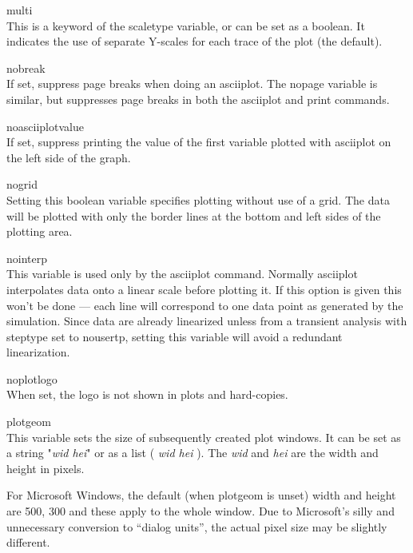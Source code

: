 \begin{description}
\item{\et multi}\\
This is a keyword of the {\et scaletype} variable, or can be set as a
boolean.  It indicates the use of separate Y-scales for each trace of
the plot (the default).

\item{\et nobreak}\\
If set, suppress page breaks when doing an {\cb asciiplot}.  The {\et
nopage} variable is similar, but suppresses page breaks in both the
{\cb asciiplot} and {\cb print} commands.

\item{\et noasciiplotvalue}\\
If set, suppress printing the value of the first variable plotted with
{\cb asciiplot} on the left side of the graph.

\item{\et nogrid}\\
Setting this boolean variable specifies plotting without use of a
grid.  The data will be plotted with only the border lines at the
bottom and left sides of the plotting area.

\item{\et nointerp}\\
This variable is used only by the {\cb asciiplot} command.  Normally
{\cb asciiplot} interpolates data onto a linear scale before plotting
it.  If this option is given this won't be done --- each line will
correspond to one data point as generated by the simulation.  Since
data are already linearized unless from a transient analysis with {\et
steptype} set to {\vt nousertp}, setting this variable will avoid a
redundant linearization.

\item{\et noplotlogo}\\
When set, the {\WRspice} logo is not shown in plots and hard-copies.

\item{\et plotgeom}\\
This variable sets the size of subsequently created plot windows.  It
can be set as a string {\vt "}{\it wid hei}{\vt "} or as a list {\vt
(} {\it wid hei} {\vt )}.  The {\it wid} and {\it hei} are the width
and height in pixels.

For Microsoft Windows, the default (when {\et plotgeom} is unset)
width and height are 500, 300 and these apply to the whole window. 
Due to Microsoft's silly and unnecessary conversion to ``dialog
units'', the actual pixel size may be slightly different.


\end{description}
